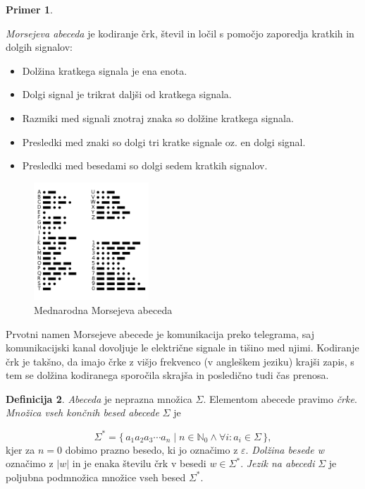 \documentclass{amsart}
\newcommand{\N}{\mathbb{N}}
\theoremstyle{definition} %
\newtheorem{definicija}{Definicija}[section]
\newtheorem{primer}[definicija]{Primer}
\theoremstyle{plain} %
\begin{document}
\begin{primer}\label{Morse}

    \textit{Morsejeva abeceda} je kodiranje črk, števil in ločil s pomočjo zaporedja kratkih
    in dolgih signalov:

    \begin{itemize}
        \item Dolžina kratkega signala je ena enota.
        \item Dolgi signal je trikrat daljši od kratkega signala.
        \item Razmiki med signali znotraj znaka so dolžine kratkega signala.
        \item Presledki med znaki so dolgi tri kratke signale oz. en dolgi signal.
        \item Presledki med besedami so dolgi sedem kratkih signalov.
    \end{itemize}

    \begin{figure}[h]
        \centering
        \includegraphics[width=4.3cm]{International_Morse_Code.svg.png}
        \caption{Mednarodna Morsejeva abeceda}
        \label{fig:Morse}
    \end{figure}

    Prvotni namen Morsejeve abecede je komunikacija preko telegrama, saj komunikacijski
    kanal dovoljuje le električne signale in tišino med njimi. Kodiranje črk je takšno,
    da imajo črke z višjo frekvenco (v angleškem jeziku) krajši zapis, s tem se dolžina
    kodiranega sporočila skrajša in posledično tudi čas prenosa.

\end{primer}

\begin{definicija}

    \textit{Abeceda} je neprazna množica $ \Sigma $. Elementom abecede pravimo \textit{črke}.
    \textit{Množica vseh končnih besed abecede} $ \Sigma $ je

    \[
        \Sigma^* = \{\, a_1 a_2 a_3 \cdots a_n \mid n \in \N_0 \land \forall i: a_i \in \Sigma \,\}, 
    \]
    kjer za $ n = 0 $ dobimo prazno besedo, ki jo označimo z $ \varepsilon $.
    \textit{Dolžina besede w} označimo z $ |w| $ in je enaka številu črk v besedi $ w \in \Sigma^* $.
    \textit{Jezik na abecedi} $ \Sigma $ je poljubna podmnožica množice vseh besed $ \Sigma^* $. 

\end{definicija}
\end{document}
